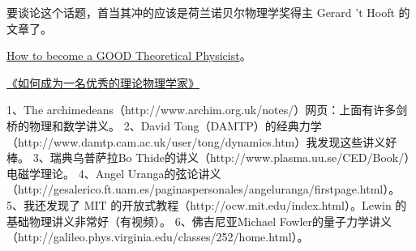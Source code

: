 
要谈论这个话题，首当其冲的应该是荷兰诺贝尔物理学奖得主 Gerard 't Hooft 的文章了。

\href{https://webspace.science.uu.nl/~hooft101/theorist.html}{How to become a GOOD Theoretical Physicist}。

\href{https://xialab.pku.edu.cn/kytdyw1/zdylm.m.jsp?wbtreeid=1011&tstreeid=11956&_t_uid=2945&language=en&homepageuuid=BF649325C5584FC683CE0B601D21AC65&templateuuid=4CC182410BA14FF8B55ED726FB2087FB&producttype=0&_tmode_=99&tsitesapptype=zdylm}{《如何成为一名优秀的理论物理学家》}

1、The archimedeans（http://www.archim.org.uk/notes/）网页：上面有许多剑桥的物理和数学讲义。
2、David Tong（DAMTP）的经典力学（http://www.damtp.cam.ac.uk/user/tong/dynamics.htm）我发现这些讲义好棒。
3、瑞典乌普萨拉Bo Thide的讲义（http://www.plasma.uu.se/CED/Book/）电磁学理论。
4、Angel Uranga的弦论讲义（http://gesalerico.ft.uam.es/paginaspersonales/angeluranga/firstpage.html）。
5、我还发现了 MIT 的开放式教程（http://ocw.mit.edu/index.html）。Lewin 的基础物理讲义非常好（有视频）。
6、佛吉尼亚Michael Fowler的量子力学讲义（http://galileo.phys.virginia.edu/classes/252/home.html）。
